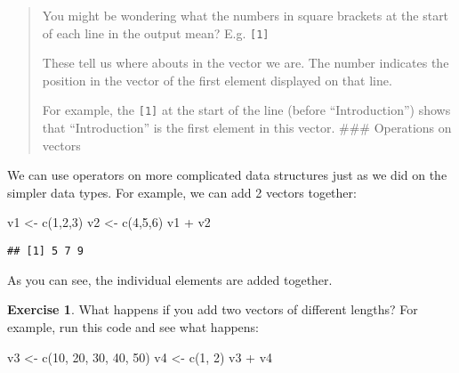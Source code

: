\documentclass[
]{article}
\newenvironment{Shaded}{\begin{snugshade}}{\end{snugshade}}
\newcommand{\DecValTok}[1]{\textcolor[rgb]{0.00,0.00,0.81}{#1}}
\newcommand{\FunctionTok}[1]{\textcolor[rgb]{0.00,0.00,0.00}{#1}}
\newcommand{\NormalTok}[1]{#1}
\newcommand{\OtherTok}[1]{\textcolor[rgb]{0.56,0.35,0.01}{#1}}
\newcommand{\SpecialCharTok}[1]{\textcolor[rgb]{0.00,0.00,0.00}{#1}}
\theoremstyle{definition}
\theoremstyle{definition}
\theoremstyle{definition}
\newtheorem{exercise}{Exercise}[section]
\theoremstyle{definition}
\theoremstyle{remark}
\begin{document}
\begin{quote}
You might be wondering what the numbers in square brackets at the start of each line in the output mean? E.g. \texttt{{[}1{]}}

These tell us where abouts in the vector we are. The number indicates the position in the vector of the first element displayed on that line.

For example, the \texttt{{[}1{]}} at the start of the line (before ``Introduction'') shows that ``Introduction'' is the first element in this vector.
\#\#\# Operations on vectors
\end{quote}

We can use operators on more complicated data structures just as we did on the simpler data types. For example, we can add 2 vectors together:

\begin{Shaded}
\begin{Highlighting}[]
\NormalTok{v1 }\OtherTok{\textless{}{-}} \FunctionTok{c}\NormalTok{(}\DecValTok{1}\NormalTok{,}\DecValTok{2}\NormalTok{,}\DecValTok{3}\NormalTok{)}
\NormalTok{v2 }\OtherTok{\textless{}{-}} \FunctionTok{c}\NormalTok{(}\DecValTok{4}\NormalTok{,}\DecValTok{5}\NormalTok{,}\DecValTok{6}\NormalTok{)}
\NormalTok{v1 }\SpecialCharTok{+}\NormalTok{ v2}
\end{Highlighting}
\end{Shaded}

\begin{verbatim}
## [1] 5 7 9
\end{verbatim}

As you can see, the individual elements are added together.

\begin{exercise}
What happens if you add two vectors of different lengths? For example, run this code and see what happens:
\end{exercise}

\begin{Shaded}
\begin{Highlighting}[]
\NormalTok{v3 }\OtherTok{\textless{}{-}} \FunctionTok{c}\NormalTok{(}\DecValTok{10}\NormalTok{, }\DecValTok{20}\NormalTok{, }\DecValTok{30}\NormalTok{, }\DecValTok{40}\NormalTok{, }\DecValTok{50}\NormalTok{)}
\NormalTok{v4 }\OtherTok{\textless{}{-}} \FunctionTok{c}\NormalTok{(}\DecValTok{1}\NormalTok{, }\DecValTok{2}\NormalTok{)}
\NormalTok{v3 }\SpecialCharTok{+}\NormalTok{ v4}
\end{Highlighting}
\end{Shaded}
\end{document}

